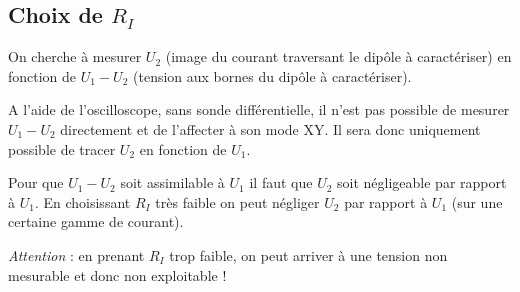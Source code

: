 \subsection{Choix de $R_I$}

On cherche à mesurer $U_2$ (image du courant traversant le dipôle à caractériser) en fonction de $U_1 - U_2$ (tension aux bornes du dipôle à caractériser).

A l'aide de l'oscilloscope, sans sonde différentielle, il n'est pas possible de mesurer $U_1 - U_2$ directement et de l'affecter à son mode XY. Il sera donc uniquement possible de tracer $U_2$ en fonction de $U_1$. 

Pour que $U_1 - U_2$ soit assimilable à $U_1$ il faut que $U_2$ soit négligeable par rapport à $U_1$. En choisissant $R_I$ très faible on peut négliger $U_2$ par rapport à $U_1$ (sur une certaine gamme de courant).

\bigskip

\textit{Attention} : en prenant $R_I$ trop faible, on peut arriver à une tension non mesurable et donc non exploitable !
